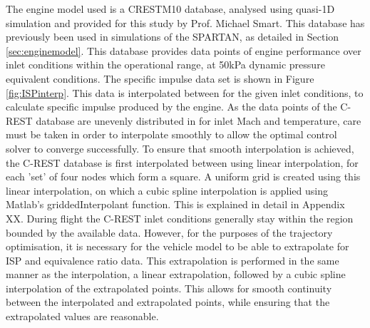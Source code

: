 The engine model used is a CRESTM10 database\cite{Preller2017,Preller2018}, analysed using quasi-1D simulation and provided for this study by Prof. Michael Smart. This database has previously been used in simulations of the SPARTAN, as detailed in Section \ref{sec:enginemodel}.
This database provides data points of engine performance over inlet conditions within the operational range, at 50kPa dynamic pressure equivalent conditions. The specific impulse data set is shown in Figure \ref{fig:ISPinterp}. This data is interpolated between for the given inlet conditions, to calculate specific impulse produced by the engine. As the data points of the C-REST database are unevenly distributed in for inlet Mach and temperature, care must be taken in order to interpolate smoothly to allow the optimal control solver to converge successfully. To ensure that smooth interpolation is achieved, the C-REST database is first interpolated between using linear interpolation, for each 'set' of four nodes which form a square. A uniform grid is created using this linear interpolation, on which a cubic spline interpolation is applied using Matlab's griddedInterpolant function. This is explained in detail in Appendix XX. During flight the C-REST inlet conditions generally stay within the region bounded by the available data. However, for the purposes of the trajectory optimisation, it is necessary for the vehicle model to be able to extrapolate for ISP and equivalence ratio data. This extrapolation is performed in the same manner as the interpolation, a linear extrapolation, followed by a cubic spline interpolation of the extrapolated points. This allows for smooth continuity between the interpolated and extrapolated points, while ensuring that the extrapolated values are reasonable. 

